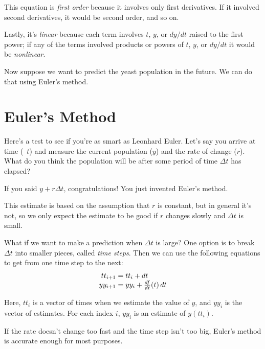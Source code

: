 
This equation is \emph{first order} because it involves only first
derivatives.  If it involved second derivatives, it would be second order,
and so on.


Lastly, it's \emph{linear} because each term involves $t$, $y$, or
$dy/dt$ raised to the first power; if any of the terms involved
products or powers of $t$, $y$, or $dy/dt$ it would be
\emph{nonlinear}.

Now suppose we want to predict the yeast population in the future.  We can do that using Euler's method.

\section{Euler's Method}

Here's a test to see if you're as smart as Leonhard Euler.  Let's say you arrive at time (~$t$) and measure the current population ($y$) and
the rate of change ($r$).  What do you think the population will
be after some period of time $\Delta t$  has elapsed?

If you said $y + r \Delta t$, congratulations!  You just invented
Euler's method.


This estimate is based on the assumption that $r$ is constant, but in general it's not, so we only expect the estimate to be good if $r$ changes slowly and $\Delta t$ is small.

What if we want to make a prediction when $\Delta t$ is large?
One option is to break $\Delta t$ into smaller pieces, called
\emph{time steps}. Then we can use the following equations to get from one time step to the next:
\begin{equation}
    \label{e:euler}
    \begin{array}{r@{}l}
        tt_{i+1} &{}= tt_i + dt   \\
        yy_{i+1} &{}= yy_i + \frac{df}{dt}(t) \, dt        
    \end{array}
\end{equation}

Here, $tt_i$ is a vector of times when we estimate the value of $y$, and $yy_i$ is the vector of estimates.
For each index $i$, $yy_i$ is an estimate of $y(tt_i)$.


If the rate doesn't change too fast and the time step isn't
too big, Euler's method is accurate enough for most purposes.

